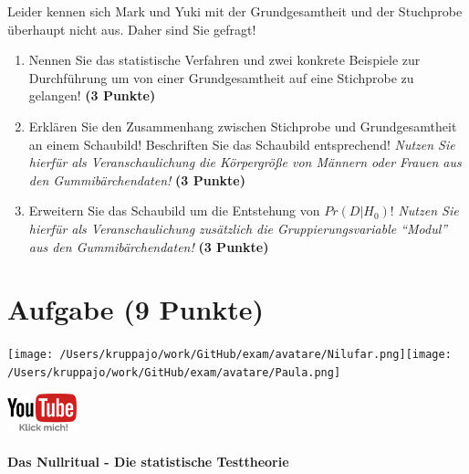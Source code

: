 \documentclass[a4paper, 9pt]{scrartcl}\usepackage[]{graphicx}\usepackage[]{xcolor}
\begin{document}
Leider kennen sich Mark und Yuki mit der Grundgesamtheit und der Stuchprobe überhaupt nicht aus. Daher sind Sie gefragt!

\begin{enumerate}
\item Nennen Sie das statistische Verfahren und zwei konkrete Beispiele zur Durchführung um von einer Grundgesamtheit auf eine Stichprobe zu gelangen! \textbf{(3 Punkte)}
\item Erklären Sie den Zusammenhang zwischen Stichprobe und Grundgesamtheit an einem Schaubild! Beschriften Sie das Schaubild entsprechend!
  \textit{Nutzen Sie hierfür als Veranschaulichung die Körpergröße von Männern oder Frauen aus den Gummibärchendaten!}  \textbf{(3 Punkte)}
\item Erweitern Sie das Schaubild um die Entstehung von $Pr(D|H_0)$! \textit{Nutzen Sie hierfür als Veranschaulichung zusätzlich die Gruppierungsvariable "`Modul"' aus den Gummibärchendaten!}  \textbf{(3 Punkte)}
\end{enumerate} 
\clearpage

\section{Aufgabe \hfill (9 Punkte)}


 
\begin{minipage}[t]{0.5\textwidth}
\texttt{[image: /Users/kruppajo/work/GitHub/exam/avatare/Nilufar.png]}\hspace{-4mm}\texttt{[image: /Users/kruppajo/work/GitHub/exam/avatare/Paula.png]}
\end{minipage}
\begin{minipage}[t]{0.5\textwidth}
\hfill
\href{https://youtu.be/Ric8ne39DtI}{\includegraphics[width = 2cm]{img/youtube}}
\end{minipage}



\paragraph{Das Nullritual - Die statistische Testtheorie}
\end{document}
